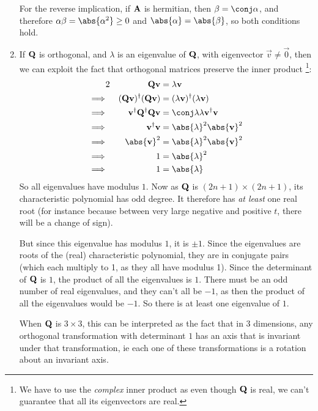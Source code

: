 \documentclass[fleqn,a4paper,11pt]{article}
\begin{document}
\begin{enumerate}[label=\textbf{\arabic*.}]
   For the reverse implication, if \(\mathbf{A}\) is hermitian, then
   \(\beta = \conj \alpha\), and therefore
   \(\alpha \beta = \abs{\alpha^2} \ge 0\)
   and \(\abs{\alpha} = \abs{\beta}\), so both conditions hold.
  \item
   If \(\mathbf{Q}\) is orthogonal, and \(\lambda\) is an eigenvalue of
   \(\mathbf{Q}\), with eigenvector \(\vec v \ne \vec 0\), then we can exploit the
   fact that orthogonal matrices preserve the inner product
   \footnote{
    We have to use the \emph{complex} inner product as even though \(\mathbf{Q}\) is
    real, we can't guarantee that all its eigenvectors are real.
   }:
   \begin{alignat*}2
    &&\mat Q \vec v &= \lambda \vec v \\
    \implies{}&&
    \herm{(\mat Q \vec v)}(\mat Q \vec v)
     &= \herm{(\lambda \vec v)}(\lambda \vec v) \\
    \implies{}&&
    \herm{\vec v}\herm{\mat Q}\mat Q \vec v
     &= \conj \lambda \lambda \herm{\vec v} \vec v \\
    \implies{}&&
    \herm{\vec v}\vec v &= \abs{\lambda}^2 \abs{\vec v}^2 \\
    \implies{}&&
    \abs{\vec v}^2 &= \abs{\lambda}^2 \abs{\vec v}^2 \\
    \implies{}&&
    1 &= \abs{\lambda}^2 \\
    \implies{}&&
    1 &= \abs{\lambda}
   \end{alignat*}
   So all eigenvalues have modulus \(1\). Now as \(\mathbf{Q}\) is
   \((2n + 1) \times (2n + 1)\), its characteristic polynomial has odd degree.
   It therefore has \emph{at least} one real root (for instance because between
   very large negative and positive \(t\), there will be a change of sign).

   But since this eigenvalue has modulus \(1\), it is \(\pm 1\). Since the
   eigenvalues are roots of the (real) characteristic polynomial, they are in
   conjugate pairs (which each multiply to 1, as they all have modulus 1). Since
   the determinant of \(\mathbf{Q}\) is \(1\), the product of all the eigenvalues is
   \(1\). There must be an odd number of real eigenvalues, and they can't all be
   \(-1\), as then the product of all the eigenvalues would be \(-1\). So there
   is at least one eigenvalue of \(1\).

   When \(\mathbf{Q}\) is \(3 \times 3\), this can be interpreted as the fact that
   in \(3\) dimensions, any orthogonal transformation with determinant \(1\) has
   an axis that is invariant under that transformation, ie each one of these
   transformations is a rotation about an invariant axis.


\end{enumerate}
\end{document}
